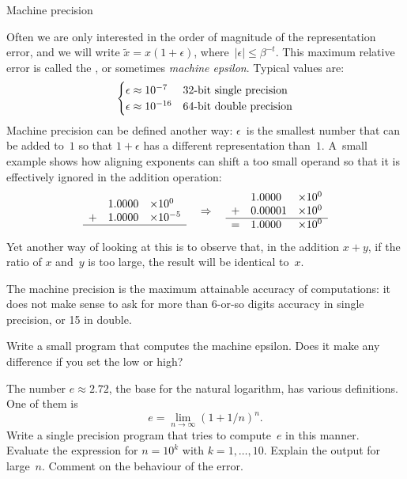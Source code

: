  {Machine precision}
\label{sec:machine-eps}

Often we are only interested in the order of magnitude of the
representation error,
and we will write $\tilde x=x(1+\epsilon)$, where~$|\epsilon|\leq\beta^{-t}$.
This maximum relative error is called the , or sometimes \emph{machine epsilon}. Typical values are:
\[
\begin{cases}
  \epsilon\approx10^{-7}&\hbox{32-bit single precision}\\
  \epsilon\approx10^{-16}&\hbox{64-bit double precision}
\end{cases}
\]
Machine precision can be defined another way: $\epsilon$~is the
smallest number that can be added to~$1$ so that $1+\epsilon$ has a
different representation than~$1$. A~small example shows how aligning
exponents can shift a too small operand so that it is effectively ignored in
the addition operation:
\[
\begin{array}{cll}
   &1.0000&\times 10^0\\
  +&1.0000&\times 10^{-5}\\ \hline
\end{array}
\quad\Rightarrow\quad
\begin{array}{cll}
   &1.0000&\times 10^0\\
  +&0.00001&\times 10^0\\ \hline
  =&1.0000&\times 10^0
\end{array}
\]
Yet another way of looking at this
is to observe that, in the addition $x+y$, if the ratio of $x$ and~$y$
is too large, the result will be identical to~$x$.

The machine precision is the maximum attainable accuracy of
computations: it does not make sense to ask for more than 6-or-so
digits accuracy in single precision, or 15 in double.

\begin{exercise}
  \label{ex:epsilon}%
  Write a small program that computes the machine epsilon. Does it
  make any difference if you set the
   low or high? 
\end{exercise}
\begin{exercise}
  The number $e\approx 2.72$, the base for the natural logarithm, has
  various definitions. One of them is 
  \[ e=\lim_{n\rightarrow\infty} (1+1/n)^n. \]
  Write a single precision program that tries to compute~$e$ in this
  manner. Evaluate the expression for $n=10^k$ with
  $k=1,\ldots,10$. Explain the output for large~$n$. Comment on the
  behaviour of the error.
\end{exercise}

